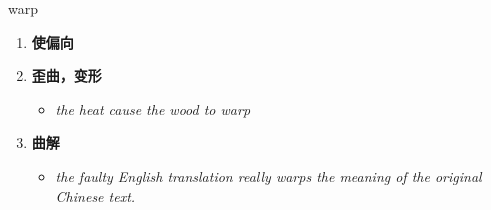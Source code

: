 
\begin{frame}
{\huge warp}
\begin{center}
\begin{enumerate}\Large
  \item \textbf{使偏向}
  \item \textbf{歪曲，变形}
  \begin{itemize}
    \item \em{\Large{the heat cause the wood to warp}}
  \end{itemize}
  \item \textbf{曲解}
  \begin{itemize}
    \item \em{\Large{the faulty English translation really warps the meaning of the original Chinese text.}}
  \end{itemize}
\end{enumerate}
\end{center}
\end{frame}
